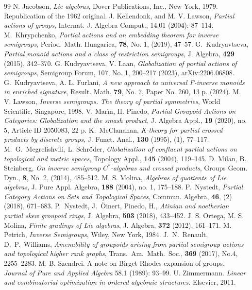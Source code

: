 \documentclass[10pt,a4paper]{amsart}
\theoremstyle{definition}
\theoremstyle{remark}
\numberwithin{equation}{section}
\newtheorem*{Theorem A}{\textbf{Theorem A}}
\newtheorem*{Corollary E}{\textbf{Corollary E}}
\newtheorem*{Corollary F}{\textbf{Corollary F}}
\newtheorem*{Theorem B}{\textbf{Theorem B}}
\newtheorem*{Theorem C}{\textbf{Theorem C}}
\newtheorem*{Theorem D}{\textbf{Theorem B}}
\newtheorem*{p a}{\textbf{Proof of  Theorem A}}
\newtheorem*{p b}{\textbf{Proof of Theorem B}}
\newtheorem*{p c}{\textbf{Proof of  Theorem C}}
\newtheorem*{p d}{\textbf{Proof of  Theorem D}}
\newcommand{\0}{{\vartheta}}
\begin{document}
\begin{thebibliography}{99}
 N. Jacobson, {\em Lie algebras}, Dover Publications, Inc., New York, 1979. Republication of the 1962 original.
 J. Kellendonk, and M. V. Lawson, {\em Partial actions of groups}, Internat. J. Algebra Comput., 14.01 (2004): 87--114.
 M.\ Khrypchenko, {\em Partial actions and an embedding theorem for inverse semigroups}, Period. Math. Hungarica, {\bf 78}, No. 1, (2019), 47--57.
 G.\ Kudryavtseva, {\em Partial monoid actions and a class of restriction semigroups}, J. Algebra, {\bf 429} (2015), 342--370.
 G. Kudryavtseva, V. Laan, {\em Globalization of partial actions of semigroups}, Semigroup Forum, 107, No. 1, 200--217 (2023), arXiv:2206.06808.
 G.\ Kudryavtseva, A. L. Furlani, {\em A new approach to universal F-inverse monoids in enriched signature}, Result. Math. {\bf 79}, No. 7, Paper No. 260, 13 p. (2024).
 M. V. Lawson, {\em Inverse semigroups. The theory of partial symmetries}, World Scientific, Singapore, 1998.
 V. Mar\'{\i}n, H. Pinedo, {\em Partial Groupoid Actions on Categories: Globalization and the smash product}, J. Algebra Appl., {\bf 19} (2020), no. 5, Article ID 2050083, 22 p.
 K.\ McClanahan, {\em K-theory for partial crossed products by discrete groups}, J. Funct. Anal., {\bf 130} (1995), (1), 77--117.
 M.\ G.\ Megrelishvili, L. Schr\"oder, {\em Globalization of confluent partial actions on topological and metric spaces}, Topology Appl., {\bf 145} (2004), 119--145.
 D. Milan, B. Steinberg, {\em On inverse semigroup $C^*$-algebras and crossed products}, Groups Geom. Dyn., {\bf 8}, No. 2, (2014), 485--512.
 M. S. Molina, {\em Algebras of quotients of Lie algebras}, J. Pure Appl. Algebra, {\bf 188} (2004), no. 1, 175--188.
 P.\ Nystedt, {\em Partial Category Actions on Sets and Topological Spaces}, Commun. Algebra, {\bf 46}, (2) (2018), 671--683.
 P.\ Nystedt, J.\ {\"O}inert, Pinedo, H., {\em Atinian and noetherian partial skew groupoid rings}, J. Algebra, {\bf 503} (2018), 433--452.
 J. S. Ortega, M. S. Molina, {\em Finite gradings of Lie algebras}, J. Algebra, {\bf 372} (2012), 161--171.
 M. Petrich, {\em Inverse Semigroups}, Wiley, New York, 1984.
 J.\ N.\ Renault, D.\ P.\ Williams, {\it Amenability of groupoids arising from partial semigroup actions and topological higher rank graphs}, Trans.\ Am.\ Math.\ Soc., {\bf 369} (2017), No.4, 2255--2283.
 M. B. Szendrei. A note on Birget-Rhodes expansion of groups. {\em Journal of Pure and Applied Algebra} 58.1 (1989): 93--99.
 U. Zimmermann. {\em Linear and combinatorial optimization in ordered algebraic structures.} Elsevier, 2011.
\end{thebibliography}
\end{document}
